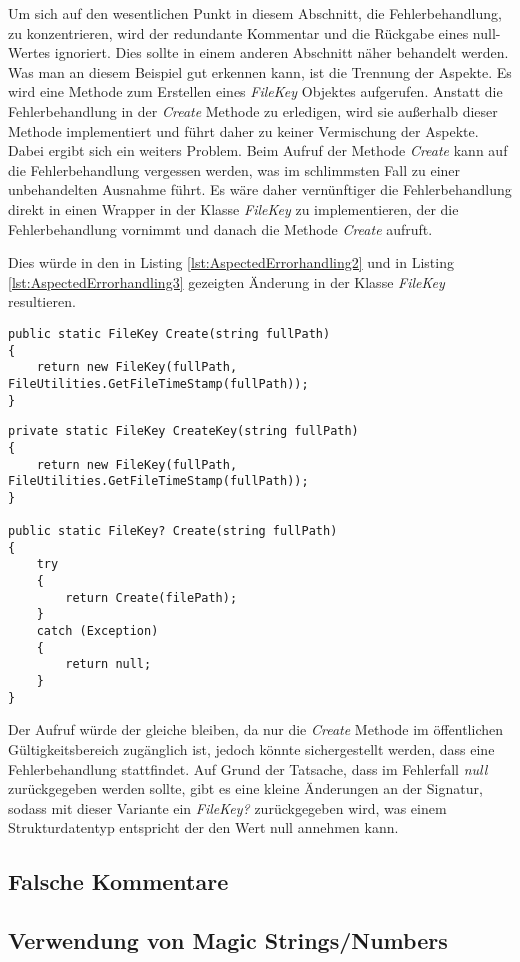 \SuperPar Um sich auf den wesentlichen Punkt in diesem Abschnitt, die Fehlerbehandlung, zu konzentrieren, wird der redundante Kommentar und die Rückgabe eines null-Wertes ignoriert. Dies sollte in einem anderen Abschnitt näher behandelt werden. %
Was man an diesem Beispiel gut erkennen kann, ist die Trennung der Aspekte. Es wird eine Methode zum Erstellen eines \textit{FileKey} Objektes aufgerufen. Anstatt die Fehlerbehandlung in der \textit{Create} Methode zu erledigen, wird sie außerhalb dieser Methode implementiert und führt daher zu keiner Vermischung der Aspekte. Dabei ergibt sich ein weiters Problem. Beim Aufruf der Methode \textit{Create} kann auf die Fehlerbehandlung vergessen werden, was im schlimmsten Fall zu einer unbehandelten Ausnahme führt. Es wäre daher vernünftiger die Fehlerbehandlung direkt in einen Wrapper in der Klasse \textit{FileKey} zu implementieren, der die Fehlerbehandlung vornimmt und danach die Methode \textit{Create} aufruft.

\SuperPar Dies würde in den in Listing \ref{lst:AspectedErrorhandling2} und in Listing \ref{lst:AspectedErrorhandling3} gezeigten Änderung in der Klasse \textit{FileKey} resultieren.

\begin{lstlisting}[language={[Sharp]C}, caption=Fehlerbehandlung in der Klasse FileKey vorher, label=lst:AspectedErrorhandling2]
public static FileKey Create(string fullPath)
{
	return new FileKey(fullPath, FileUtilities.GetFileTimeStamp(fullPath));
}
\end{lstlisting}

\begin{lstlisting}[language={[Sharp]C}, caption=Fehlerbehandlung in der Klasse FileKey nachher, label=lst:AspectedErrorhandling3]
private static FileKey CreateKey(string fullPath)
{
	return new FileKey(fullPath, FileUtilities.GetFileTimeStamp(fullPath));
}
				
public static FileKey? Create(string fullPath)
{
	try
	{
		return Create(filePath);
	}
	catch (Exception)
	{
		return null;
	}
}
\end{lstlisting}

\SuperPar Der Aufruf würde der gleiche bleiben, da nur die \textit{Create} Methode im öffentlichen Gültigkeitsbereich zugänglich ist, jedoch könnte sichergestellt werden, dass eine Fehlerbehandlung stattfindet. Auf Grund der Tatsache, dass im Fehlerfall \textit{null} zurückgegeben werden sollte, gibt es eine kleine Änderungen an der Signatur, sodass mit dieser Variante ein \textit{FileKey?} zurückgegeben wird, was einem Strukturdatentyp entspricht der den Wert null annehmen kann. 

\subsection{Falsche Kommentare}
\subsection{Verwendung von Magic Strings/Numbers}